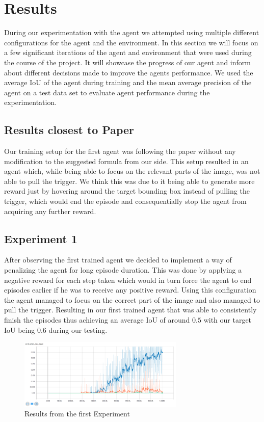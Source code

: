 \section{Results}\label{sec:Results}
During our experimentation with the agent we attempted using multiple different configurations for the agent and the environment.
In this section we will focus on a few significant iterations of the agent and environment that were used during the course of the project.
It will showcase the progress of our agent and inform about different decisions made to improve the agents performance.
We used the average IoU of the agent during training and the mean average precision of the agent on a test data set to evaluate agent performance during the experimentation.


\subsection{Results closest to Paper}
Our training setup for the first agent was following the paper\cite{caicedo2015active} without any modification to the suggested formula from our side.
This setup resulted in an agent which, while being able to focus on the relevant parts of the image, was not able to pull the trigger.
We think this was due to it being able to generate more reward just by hovering around the target bounding box instead of pulling the trigger, which would end the episode and consequentially stop the agent from acquiring any further reward.

\subsection{Experiment 1}
After observing the first trained agent we decided to implement a way of penalizing the agent for long episode duration.
This was done by applying a negative reward for each step taken which would in turn force the agent to end episodes earlier if he was to receive any positive reward.
Using this configuration the agent managed to focus on the correct part of the image and also managed to pull the trigger.
Resulting in our first trained agent that was able to consistently finish the episodes thus achieving an average IoU of around $0.5$ with our target IoU being $0.6$ during our testing.

\begin{figure}[h!]
    \centering
    \includegraphics[width=0.7\textwidth]{figures/penalty_results.png}
    \caption{Results from the first Experiment}
\end{figure}

